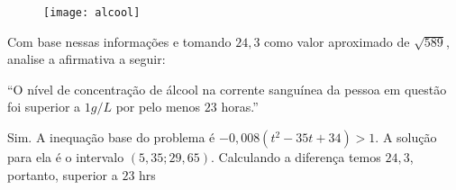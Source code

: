 \documentclass[10 pt,usenames,dvipsnames, oneside]{article}
\begin{document}
\begin{figure}[H]
\centering
\noindent\texttt{[image: alcool]}
\end{figure}

Com base nessas informações e tomando $24{,}3$ como valor aproximado de $\sqrt{589}$, analise a afirmativa a seguir:

“O nível de concentração de álcool na corrente sanguínea da pessoa em questão foi superior a $1 g/L$ por pelo menos $23$ horas.”

\ifdefined\prof
\begin{solucao}

Sim. A inequação base do problema é $-0{,}008(t^2-35t + 34)>1.$ A solução para ela é o intervalo $(5{,}35;29{,}65)$. Calculando a diferença temos $24{,}3$, portanto, superior a $23$ hrs

\end{solucao}
\fi
\end{document}
